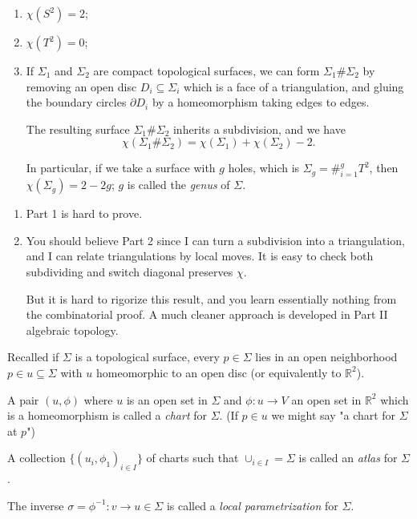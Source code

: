 \begin{example}
    \leavevmode
    \begin{enumerate}
        \item \(\chi(S^2) = 2\);
        \item \(\chi(T^2) = 0\);
        \item If \(\Sigma_1\) and \(\Sigma_{2}\) are compact topological surfaces, we can form \(\Sigma_1 \# \Sigma_2\) by removing an open disc \(D_i \subseteq \Sigma_i\) which is a face of a triangulation, and gluing the boundary circles \(\partial D_i\) by a homeomorphism taking edges to edges.
        
        The resulting surface \(\Sigma_1 \# \Sigma_2\) inherits a subdivision, and we have
        \[
            \chi (\Sigma_1 \# \Sigma_2) = \chi(\Sigma_1) + \chi(\Sigma_{2}) - 2.
        \]

        In particular, if we take a surface with \(g\) holes, which is \(\Sigma_g = \#^{g}_{i=1}T^2\), then \(\chi(\Sigma_g) = 2 - 2g\); \(g\) is called the \textit{genus} of \(\Sigma\).
    \end{enumerate}
\end{example}
\begin{remark}
    \leavevmode
    \begin{enumerate}
        \item Part 1 is hard to prove.
        \item You should believe Part 2 since I can turn a subdivision into a triangulation, and I can relate triangulations by local moves. It is easy to check both subdividing and switch diagonal preserves \(\chi\).

        But it is hard to rigorize this result, and you learn essentially nothing from the combinatorial proof. A much cleaner approach is developed in Part II algebraic topology.
    \end{enumerate}
\end{remark}
Recalled if \(\Sigma\) is a topological surface, every \(p \in \Sigma\) lies in an open neighborhood \(p \in u \subseteq \Sigma\) with \(u\) homeomorphic to an open disc (or equivalently to \(\mathbb{R}^2\)).
\begin{definition}
    A pair \((u, \phi)\) where \(u\) is an open set in \(\Sigma\) and \(\phi : u \to V \) an open set in \(\mathbb{R}^2\) which is a homeomorphism is called a \textit{chart} for \(\Sigma\). (If \(p\in u\) we might say "a chart for \(\Sigma\) at \(p\)")

    A collection \(\{(u_i, \phi_1)_{i\in I}\}\) of charts such that \(\cup_{i\in I} = \Sigma\) is called an \textit{atlas} for \(\Sigma\).

    The inverse \(\sigma = \phi^{-1}:v \to u \in \Sigma\) is called a \textit{local parametrization} for \(\Sigma\).
\end{definition}
